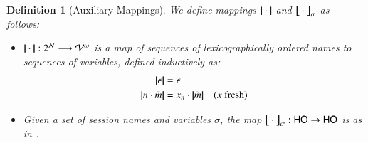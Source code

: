 \documentclass[preprint,11pt]{elsarticle}
\newtheorem{definition}{Definition}[section]
\newtheorem{proposition}{Proposition}[section]
\begin{document}
{{%

%

%




\begin{definition}[Auxiliary Mappings] \label{d:trabs}
\label{d:auxmap}
We define mappings $|\!|\cdot|\!|$ and $\big\lfloor\!\!\big\lfloor\cdot\big\rfloor\!\!\big\rfloor^{}_\sigma$ as follows:
\begin{itemize}
\item  $|\!|\cdot|\!|: 2^{\mathcal{N}} \longrightarrow \mathcal{V}^\omega$
	is a map of sequences of lexicographically ordered names to sequences of variables, defined
	inductively 
	as: 
	\begin{align*}
	|\!|\epsilon|\!| & = \epsilon 
	\\
	|\!|n \cdot \tilde{m}|\!| & = x_n \cdot |\!|\tilde{m}|\!| \quad \text{($x$ fresh)}
	\end{align*}

\item Given a set of session names and variables $\sigma$, 
	 the   map
	$\big\lfloor\!\!\big\lfloor\cdot\big\rfloor\!\!\big\rfloor^{}_\sigma: \mathsf{HO} \to \mathsf{HO}$
	is as in .
	\end{itemize}
\end{definition}

%





}}
\end{document}
